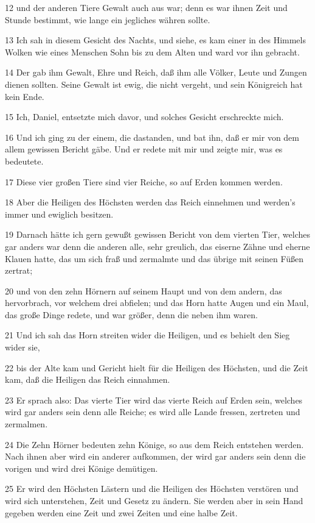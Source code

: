 \par 12 und der anderen Tiere Gewalt auch aus war; denn es war ihnen Zeit und Stunde bestimmt, wie lange ein jegliches währen sollte.
\par 13 Ich sah in diesem Gesicht des Nachts, und siehe, es kam einer in des Himmels Wolken wie eines Menschen Sohn bis zu dem Alten und ward vor ihn gebracht.
\par 14 Der gab ihm Gewalt, Ehre und Reich, daß ihm alle Völker, Leute und Zungen dienen sollten. Seine Gewalt ist ewig, die nicht vergeht, und sein Königreich hat kein Ende.
\par 15 Ich, Daniel, entsetzte mich davor, und solches Gesicht erschreckte mich.
\par 16 Und ich ging zu der einem, die dastanden, und bat ihn, daß er mir von dem allem gewissen Bericht gäbe. Und er redete mit mir und zeigte mir, was es bedeutete.
\par 17 Diese vier großen Tiere sind vier Reiche, so auf Erden kommen werden.
\par 18 Aber die Heiligen des Höchsten werden das Reich einnehmen und werden's immer und ewiglich besitzen.
\par 19 Darnach hätte ich gern gewußt gewissen Bericht von dem vierten Tier, welches gar anders war denn die anderen alle, sehr greulich, das eiserne Zähne und eherne Klauen hatte, das um sich fraß und zermalmte und das übrige mit seinen Füßen zertrat;
\par 20 und von den zehn Hörnern auf seinem Haupt und von dem andern, das hervorbrach, vor welchem drei abfielen; und das Horn hatte Augen und ein Maul, das große Dinge redete, und war größer, denn die neben ihm waren.
\par 21 Und ich sah das Horn streiten wider die Heiligen, und es behielt den Sieg wider sie,
\par 22 bis der Alte kam und Gericht hielt für die Heiligen des Höchsten, und die Zeit kam, daß die Heiligen das Reich einnahmen.
\par 23 Er sprach also: Das vierte Tier wird das vierte Reich auf Erden sein, welches wird gar anders sein denn alle Reiche; es wird alle Lande fressen, zertreten und zermalmen.
\par 24 Die Zehn Hörner bedeuten zehn Könige, so aus dem Reich entstehen werden. Nach ihnen aber wird ein anderer aufkommen, der wird gar anders sein denn die vorigen und wird drei Könige demütigen.
\par 25 Er wird den Höchsten Lästern und die Heiligen des Höchsten verstören und wird sich unterstehen, Zeit und Gesetz zu ändern. Sie werden aber in sein Hand gegeben werden eine Zeit und zwei Zeiten und eine halbe Zeit.
